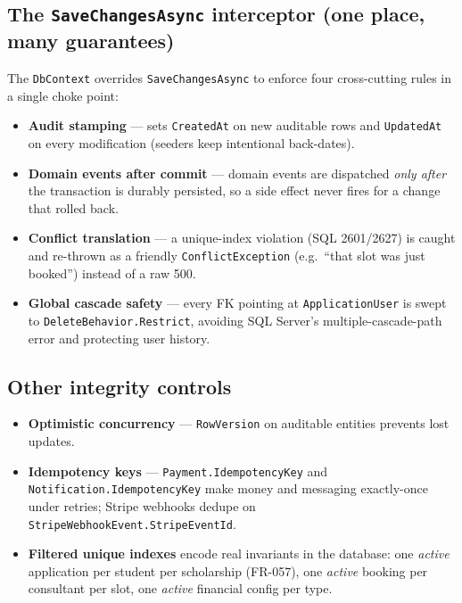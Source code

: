 \documentclass[11pt,a4paper]{article}
\newcommand{\code}[1]{\texttt{\textcolor{spInk}{#1}}}
\begin{document}
\subsection{The \code{SaveChangesAsync} interceptor (one place, many guarantees)}
The \code{DbContext} overrides \code{SaveChangesAsync} to enforce four
cross-cutting rules in a single choke point:

\begin{itemize}
\item \textbf{Audit stamping} --- sets \code{CreatedAt} on new auditable rows and
  \code{UpdatedAt} on every modification (seeders keep intentional back-dates).
\item \textbf{Domain events after commit} --- domain events are dispatched
  \emph{only after} the transaction is durably persisted, so a side effect never
  fires for a change that rolled back.
\item \textbf{Conflict translation} --- a unique-index violation (SQL 2601/2627) is
  caught and re-thrown as a friendly \code{ConflictException} (e.g.\ ``that slot
  was just booked'') instead of a raw 500.
\item \textbf{Global cascade safety} --- every FK pointing at \code{ApplicationUser}
  is swept to \code{DeleteBehavior.Restrict}, avoiding SQL Server's
  multiple-cascade-path error and protecting user history.
\end{itemize}

\subsection{Other integrity controls}
\begin{itemize}
\item \textbf{Optimistic concurrency} --- \code{RowVersion} on auditable entities
  prevents lost updates.
\item \textbf{Idempotency keys} --- \code{Payment.IdempotencyKey} and
  \code{Notification.IdempotencyKey} make money and messaging exactly-once under
  retries; Stripe webhooks dedupe on \code{StripeWebhookEvent.StripeEventId}.
\item \textbf{Filtered unique indexes} encode real invariants in the database:
  one \emph{active} application per student per scholarship (FR-057), one
  \emph{active} booking per consultant per slot, one \emph{active} financial
  config per type.
\end{itemize}

\end{document}
